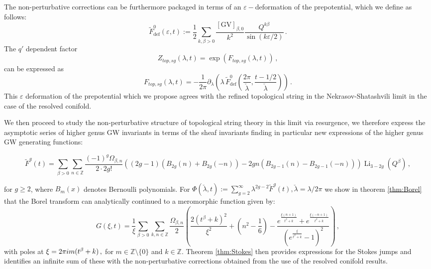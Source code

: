 \documentclass[a4paper,12pt,justification=centering]{article}
\numberwithin{equation}{section}
\newcommand{\ii}{\textnormal{i}}
\theoremstyle{plain}%
\theoremstyle{definition}
\begin{document}
 The non-perturbative corrections can be furthermore packaged in terms of an $\varepsilon-$deformation of the prepotential, which we define as follows:
\begin{equation}
\tilde{F}^{0}_{\textrm{def}}(\varepsilon,t):=\frac{1}{2} \sum_{k,\beta>0} \frac{[\textrm{GV}]_{\beta,0}}{k^2} \frac{Q^{k\beta}}{\sin(k\varepsilon/2)}\,.
\end{equation}
 The $q'$ dependent factor
 $$Z_{top,sg}(\lambda,t)= \exp\left( F_{top,sg}(\lambda,t)\right)\,,$$
 can be expressed as
 \begin{equation}
F_{top,sg}(\lambda,t)=  -\frac{1}{2\pi} \partial_{\lambda} \left( \lambda \, \tilde{F}^{0}_{\textrm{def}} \left( \frac{2\pi}{\check{\lambda}}, \frac{t-1/2}{\check{\lambda}} \right)\right)\,.
\end{equation}
This $\varepsilon$ deformation of the prepotential which we propose agrees with the refined topological string in the Nekrasov-Shatashvili limit in the case of the resolved conifold.

We then proceed to study the non-perturbative structure of topological string theory in this limit via resurgence, we therefore express the asymptotic series of higher genus GW invariants in terms of the sheaf invariants finding in particular new expressions of the higher genus GW generating functions:

\begin{equation}
\tilde{F}^g(t)= \sum_{\beta>0} \sum_{n\in\mathbb{Z}}\frac{(-1)^g \Omega_{\beta,n}}{2\cdot2g!} \left( (2g-1) (B_{2g}(n)+B_{2g}(-n))- 2g n (B_{2g-1}(n)-B_{2g-1}(-n))\right)  \operatorname{Li}_{3-2g}(Q^{\beta}) \,,
\end{equation}

for $g\ge 2$, where $B_m(x)$ denotes Bernoulli polynomials. For $\Phi(\check{\lambda},t):= \sum_{g=2}^{\infty} \lambda^{2g-2} \tilde{F}^g(t), \check{\lambda}=\lambda/2\pi$  we show in theorem \ref{thm:Borel} that the Borel transform can analytically continued to a meromorphic function given by:
\begin{equation} 
G(\xi,t) 
=  \frac{1}{\xi} \sum_{\beta>0} \sum_{k,n\in \mathbb{Z}} \frac{\Omega_{\beta, n}}{2}
\left(
  \frac{2(t^{\beta}+k)^2}{\xi^2}
  + \left(n^2 - \frac{1}{6}\right)
  - \frac{
      e^{\frac{\xi(n+1)}{t^{\beta}+k}}
      + e^{\frac{\xi(-n+1)}{t^{\beta}+k}}
    }{
       \left( e^{\frac{\xi}{t^{\beta}+k}} - 1 \right)^2
    } 
\right)\,,
\end{equation}
with poles at $\xi= 2\pi \ii m  (t^\beta+k)\,,$ for $m\in \mathbb{Z}\setminus \{0\}$ and $k\in \mathbb{Z}$. Theorem \ref{thm:Stokes} then provides expressions for the Stokes jumps and identifies an infinite sum of these with the non-perturbative corrections obtained from the use of the resolved conifold results.
\end{document}
